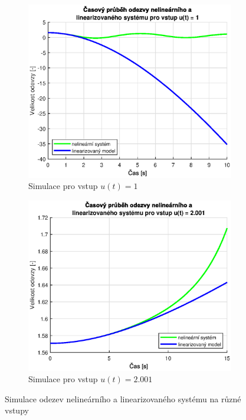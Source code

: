 \documentclass[twoside]{article}
\begin{document}
\begin{figure}[htbp]
    \centering %
\begin{subfigure}{0.45\textwidth}
  \includegraphics[width=\linewidth]{graph33_vstup1.eps}
  \caption{Simulace pro vstup $u(t) = 1$}
\end{subfigure}\hfil %
\begin{subfigure}{0.45\textwidth}
	\includegraphics[width=\linewidth]{graph33_vstup2.eps}
	\caption{Simulace pro vstup $u(t) = 2.001$}
\end{subfigure}
\caption{Simulace odezev nelineárního a linearizovaného systému na různé vstupy}
\label{fig:linearizace}
\end{figure}
\end{document}
